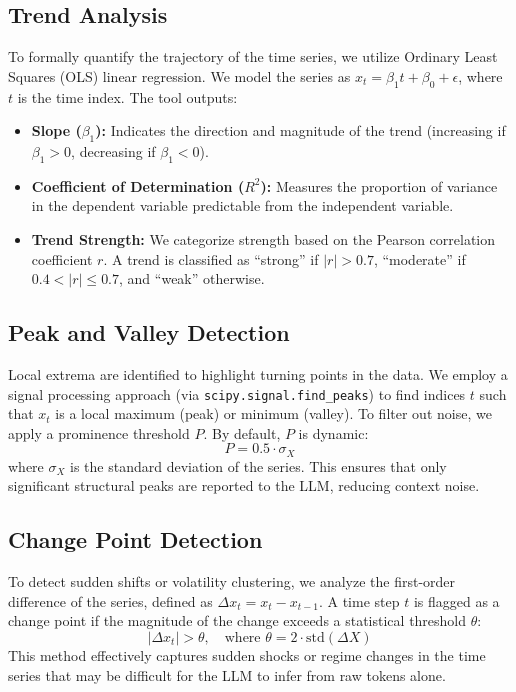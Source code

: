 \documentclass{article}
\theoremstyle{plain}
\theoremstyle{definition}
\theoremstyle{remark}
\theoremstyle{plain}
\begin{document}
\subsection{Trend Analysis}
To formally quantify the trajectory of the time series, we utilize Ordinary Least Squares (OLS) linear regression. We model the series as $x_t = \beta_1 t + \beta_0 + \epsilon$, where $t$ is the time index. The tool outputs:
\begin{itemize}
    \item \textbf{Slope ($\beta_1$):} Indicates the direction and magnitude of the trend (increasing if $\beta_1 > 0$, decreasing if $\beta_1 < 0$).
    \item \textbf{Coefficient of Determination ($R^2$):} Measures the proportion of variance in the dependent variable predictable from the independent variable.
    \item \textbf{Trend Strength:} We categorize strength based on the Pearson correlation coefficient $r$. A trend is classified as ``strong'' if $|r| > 0.7$, ``moderate'' if $0.4 < |r| \le 0.7$, and ``weak'' otherwise.
\end{itemize}

\subsection{Peak and Valley Detection}
Local extrema are identified to highlight turning points in the data. We employ a signal processing approach (via \texttt{scipy.signal.find\_peaks}) to find indices $t$ such that $x_t$ is a local maximum (peak) or minimum (valley). To filter out noise, we apply a prominence threshold $P$. By default, $P$ is dynamic:
\begin{equation}
    P = 0.5 \cdot \sigma_X
\end{equation}
where $\sigma_X$ is the standard deviation of the series. This ensures that only significant structural peaks are reported to the LLM, reducing context noise.

\subsection{Change Point Detection}
To detect sudden shifts or volatility clustering, we analyze the first-order difference of the series, defined as $\Delta x_t = x_t - x_{t-1}$. A time step $t$ is flagged as a change point if the magnitude of the change exceeds a statistical threshold $\theta$:
\begin{equation}
    |\Delta x_t| > \theta, \quad \text{where } \theta = 2 \cdot \text{std}(\Delta X)
\end{equation}
This method effectively captures sudden shocks or regime changes in the time series that may be difficult for the LLM to infer from raw tokens alone.
\end{document}
